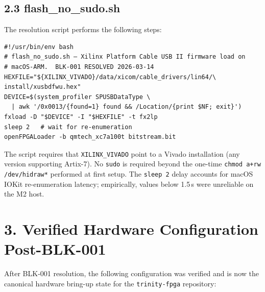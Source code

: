 \subsection{2.3 flash\_no\_sudo.sh}\label{sec:epilogue-flashscript}

The resolution script performs the following steps:

\begin{verbatim}
#!/usr/bin/env bash
# flash_no_sudo.sh — Xilinx Platform Cable USB II firmware load on
# macOS-ARM.  BLK-001 RESOLVED 2026-03-14
HEXFILE="${XILINX_VIVADO}/data/xicom/cable_drivers/lin64/\
install/xusbdfwu.hex"
DEVICE=$(system_profiler SPUSBDataType \
  | awk '/0x0013/{found=1} found && /Location/{print $NF; exit}')
fxload -D "$DEVICE" -I "$HEXFILE" -t fx2lp
sleep 2   # wait for re-enumeration
openFPGALoader -b qmtech_xc7a100t bitstream.bit
\end{verbatim}

The script requires that \texttt{XILINX\_VIVADO} point to a Vivado
installation (any version supporting Artix-7).  No \texttt{sudo} is required
beyond the one-time \verb|chmod a+rw /dev/hidraw*| performed at first setup.
The \texttt{sleep 2} delay accounts for macOS IOKit re-enumeration latency;
empirically, values below 1.5\,s were unreliable on the M2 host.

\section{3. Verified Hardware Configuration Post-BLK-001}%
\label{sec:epilogue-hw}

After BLK-001 resolution, the following configuration was verified and is
now the canonical hardware bring-up state for the \texttt{trinity-fpga}
repository:

\begin{center}
\end{center}


